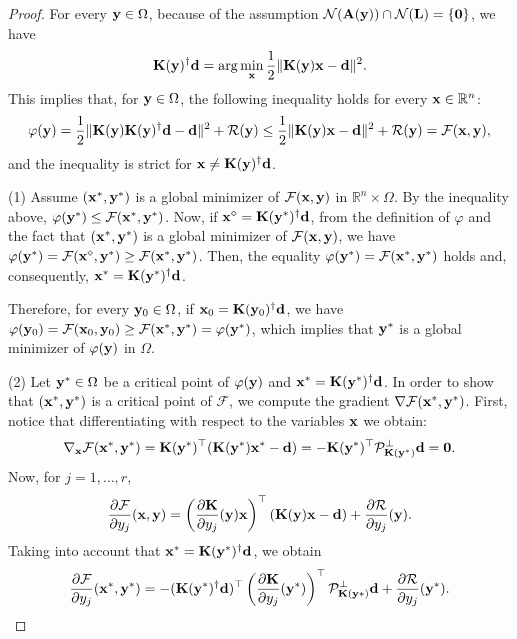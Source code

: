 \documentclass[onefignum,onetabnum]{siamart171218}
\newcommand{\bA}{{\bf A}}
\newcommand{\bK}{{\bf K}}
\newcommand{\bL}{{\bf L}}
\newcommand{\bd}{{\bf d}}
\newcommand{\bx}{{\bf x}}
\newcommand{\by}{{\bf y}}
\newcommand{\calF}{\mathcal{F}}
\newcommand{\calN}{\mathcal{N}}
\newcommand{\calP}{\mathcal{P}}
\newcommand{\calR}{\mathcal{R}}
\newcommand{\bbR}{\mathbb{R}}
\begin{document}
\begin{proof}
For every $\by \in \Omega$, because of the assumption $\calN(\bA(\by))\cap \calN(\bL) = \{\boldsymbol{0}\}$, we have  
\[\bK(\by)^{\dagger} \bd = \arg\min_\bx \frac{1}{2}\| \bK(\by) \bx - \bd\|^2.\]
This implies that, for $\by\in \Omega$, the following inequality holds for every $\bx\in \bbR^n$: 
\begin{equation}\label{eq: varphi-calF}
\varphi(\by) = \dfrac{1}{2} \| \bK(\by) \bK(\by)^{\dagger} \bd - \bd\|^2 +\calR(\by)\le \dfrac{1}{2} \| \bK(\by) \bx- \bd\|^2 +\calR(\by) = \calF(\bx, \by),
\end{equation}
and the inequality is strict for $\bx \ne \bK(\by)^{\dagger} \bd$.

\medskip
\noindent (1) Assume $(\bx^*, \by^*)$ is a global minimizer of $\calF(\bx, \by)$ in $\bbR^n \times \Omega$. By the inequality above, $\varphi(\by^*)\le \calF(\bx^*, \by^*)$. Now, if $\bx^{\diamond}= \bK(\by^*)^{\dagger}\bd$, from the definition of $\varphi$ and the fact that $(\bx^*, \by^*)$ is a global minimizer of $\calF(\bx, \by)$, we have
$\varphi(\by^*) = \calF(\bx^{\diamond}, \by^*) \ge \calF(\bx^*, \by^*)$. Then, the equality $\varphi(\by^*) = \calF(\bx^*, \by^*)$ holds and, consequently, $\bx^* = \bK(\by^*)^{\dagger}\bd$.

Therefore, for every $\by_0\in \Omega$, if $\bx_0= \bK(\by_0)^\dagger \bd$, we have $\varphi(\by_0) = \calF(\bx_0, \by_0) \ge \calF(\bx^*, \by^*) = \varphi(\by^*)$, which implies that $\by^*$ is a global minimizer of $\varphi(\by)$ in $\Omega$.

\medskip
\noindent (2) Let $\by^*\in \Omega$ be a critical point of $\varphi(\by)$ and $\bx^* = \bK(\by^*)^{\dagger} \bd$. In order to show that $(\bx^*, \by^*)$ is a critical point of $\calF$, we compute the gradient $\nabla \calF(\bx^*, \by^*)$. 
 First, notice that differentiating with respect to the variables $\bx$ we obtain:
\[\nabla_\bx \calF(\bx^*, \by^*) = \bK(\by^*)^\top (\bK(\by^*) \bx^* - \bd) = - \bK(\by^*)^\top \calP_{\bK(\by^*)}^\perp \bd = \boldsymbol{0}.\]
Now, for $j=1,\dots, r$,
\[\dfrac{\partial \calF}{\partial y_j} (\bx, \by)  = \left(\dfrac{\partial \bK}{\partial y_j}(\by)\bx\right)^\top (\bK(\by)\bx- \bd)+ \dfrac{\partial \calR}{\partial y_j}(\by).\]
Taking into account that $\bx^* = \bK(\by^*)^{\dagger} \bd$, we obtain
\begin{equation}\label{eq: diffcalF}
\dfrac{\partial \calF}{\partial y_j} (\bx^*, \by^*) = -(\bK(\by^*)^{\dagger} \bd )^\top \left(\dfrac{\partial \bK}{\partial y_j}(\by^*)\right)^\top \calP_{\bK(\by*)}^\perp \bd + \dfrac{\partial \calR}{\partial y_j}(\by^*). 
\end{equation}


\end{proof}
\end{document}
